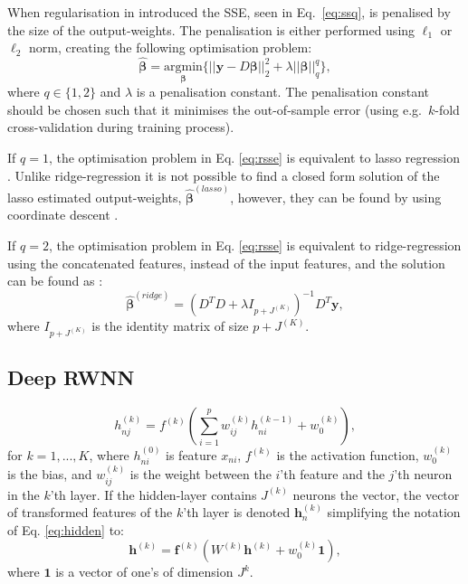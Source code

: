 \documentclass[
]{jss}
\begin{document}
When regularisation in introduced the SSE, seen in Eq.~\eqref{eq:ssq},
is penalised by the size of the output-weights. The penalisation is
either performed using \(\ell_1\) or \(\ell_2\) norm, creating the
following optimisation problem: \begin{equation}
\hat{\boldsymbol{\beta}} = \underset{\boldsymbol{\beta}}{\text{argmin}} \Big\{ || \boldsymbol{y} - D\boldsymbol{\beta}||_2^2  + \lambda||\boldsymbol{\beta}||_q^q \Big\}, \label{eq:rsse}
\end{equation} where \(q \in \{1, 2\}\) and \(\lambda\) is a
penalisation constant. The penalisation constant should be chosen such
that it minimises the out-of-sample error (using e.g.~\(k\)-fold
cross-validation during training process).

If \(q = 1\), the optimisation problem in Eq. \eqref{eq:rsse} is
equivalent to lasso regression \citep[\citet{TibLasso}]{SanLasso}.
Unlike ridge-regression it is not possible to find a closed form
solution of the lasso estimated output-weights,
\(\hat{\boldsymbol{\beta}}^{(lasso)}\), however, they can be found by
using coordinate descent \citep{CoordLasso}.

If \(q = 2\), the optimisation problem in Eq. \eqref{eq:rsse} is
equivalent to ridge-regression using the concatenated features, instead
of the input features, and the solution can be found as
\citep{ridgeReg}: \begin{equation}
\hat{\boldsymbol \beta}^{(ridge)} = \left(D^TD + \lambda I_{p + J^{(K)}}\right)^{-1}D^T\boldsymbol y,
\end{equation} where \(I_{p+J^{(K)}}\) is the identity matrix of size
\(p+J^{(K)}\).

\hypertarget{deep-rwnn}{%
\subsection{Deep RWNN}\label{deep-rwnn}}

\begin{equation}
h_{nj}^{(k)} = f^{(k)}\left(\sum_{i = 1}^p w^{(k)}_{ij} h_{ni}^{(k - 1)} + w^{(k)}_{0}\right), \label{eq:hidden}
\end{equation} for \(k = 1, ..., K\), where \(h_{ni}^{(0)}\) is feature
\(x_{ni}\), \(f^{(k)}\) is the activation function, \(w^{(k)}_0\) is the
bias, and \(w^{(k)}_{ij}\) is the weight between the \(i\)'th feature
and the \(j\)'th neuron in the \(k\)'th layer. If the hidden-layer
contains \(J^{(k)}\) neurons the vector, the vector of transformed
features of the \(k\)'th layer is denoted \(\boldsymbol h^{(k)}_{n}\)
simplifying the notation of Eq. \eqref{eq:hidden} to: \begin{equation}
\boldsymbol h^{(k)} = \boldsymbol f^{(k)}\left(W^{(k)} \boldsymbol{h}^{(k)} + w^{(k)}_0 \boldsymbol{1}\right),
\end{equation} where \(\boldsymbol{1}\) is a vector of one's of
dimension \(J^{k}\).
\end{document}
